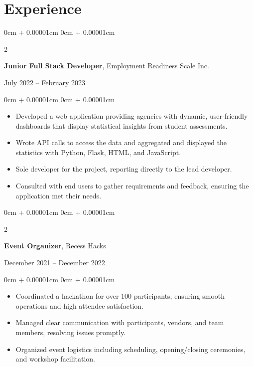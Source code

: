\documentclass[10pt, letterpaper]{article}
\newenvironment{highlights}{
    \begin{itemize}[
        topsep=0.10cm,
        parsep=0.10cm,
        partopsep=0pt,
        itemsep=0pt,
        leftmargin=0cm + 10pt
    ]
}{
    \end{itemize}
}
\newenvironment{onecolentry}{
    \begin{adjustwidth}{
        0cm + 0.00001cm
    }{
        0cm + 0.00001cm
    }
}{
    \end{adjustwidth}
}
\newenvironment{twocolentry}[2][]{
    \onecolentry
    \def\secondColumn{#2}
    \setcolumnwidth{\fill, 5.5 cm} %
    \begin{paracol}{2}
}{
    \switchcolumn \raggedleft \secondColumn
    \end{paracol}
    \endonecolentry
}
\begin{document}
    \section{Experience}
    \begin{twocolentry}{July 2022 – February 2023}
        \textbf{Junior Full Stack Developer}, Employment Readiness Scale Inc.
    \end{twocolentry}
    \vspace{0.10cm}
    \begin{onecolentry}
        \begin{highlights}
            \item Developed a web application providing agencies with dynamic, user-friendly dashboards that display statistical insights from student assessments.
            \item Wrote API calls to access the data and aggregated and displayed the statistics with Python, Flask, HTML, and JavaScript. 
            \item Sole developer for the project, reporting directly to the lead developer.
            \item Consulted with end users to gather requirements and feedback, ensuring the application met their needs.
        \end{highlights}
    \end{onecolentry}

    \vspace{0.2cm}

    \begin{twocolentry}{December 2021 – December 2022}
        \textbf{Event Organizer}, Recess Hacks
    \end{twocolentry}
    \begin{onecolentry}
        \begin{highlights}
            \item Coordinated a hackathon for over 100 participants, ensuring smooth operations and high attendee satisfaction.
            \item Managed clear communication with participants, vendors, and team members, resolving issues promptly.
            \item Organized event logistics including scheduling, opening/closing ceremonies, and workshop facilitation.
        \end{highlights}
    \end{onecolentry}
\end{document}
